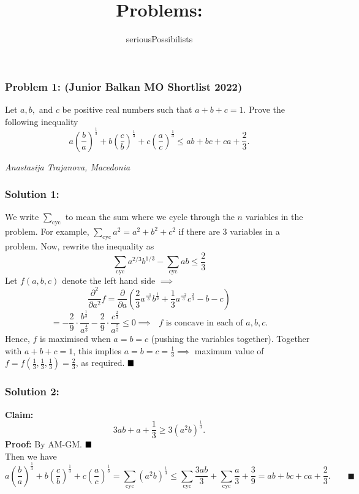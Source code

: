 \documentclass[fontsize=9pt]{scrartcl}
\begin{document}
\title{ Problems: }
\author{seriousPossibilists}
\date{}
\maketitle

\subsubsection*{Problem 1: (Junior Balkan MO Shortlist 2022)} 
Let $a, b,$ and $c$ be positive real numbers such that $a + b + c = 1$. Prove the following inequality
 \[ a \left({\frac{b}{a}} \right)^{\frac13} + b \left({\frac{c}{b}} \right)^{\frac13} + c \left({\frac{a}{c}} \right)^{\frac13} \le ab + bc + ca + \frac{2}{3}. \]
    \begin{flushright}
        { \emph{Anastasija Trajanova, Macedonia} }
    \end{flushright}
\subsubsection*{Solution 1:} We write $\sum_{\text{cyc}}$ to mean the sum where we cycle through the $n$ variables in the problem. \newline
For example, $\sum_{\text{cyc}} a^2 = a^2 + b^2+c^2$ if there are $3$ variables in a problem. \newline
Now, rewrite the inequality as \[\sum_{\text{cyc}} a^{2/3}b^{1/3} - \sum_{\text{cyc}} ab \le \frac 23\]
Let $f(a,b,c)$ denote the left hand side $\implies$ \[\frac{\partial^2}{\partial a^2}f = \frac{\partial}{\partial a} \left( \frac 23 a^{\frac{-1}{3}}b^{\frac 13} + \frac 13 a^{\frac{-2}3} c^{\frac 23} - b-c \right)\] \[=-\frac{2}{9} \cdot \frac{b^{\frac 13}}{a^{\frac 43}} - \frac 29 \cdot \frac{c^{\frac 23}}{a^{\frac 53}} \le 0 \implies \text{ $f$ is concave in each of $a,b,c$.}\]
Hence, $f$ is maximised when $a=b=c$ (pushing the variables together). Together with $a+b+c = 1$, this implies
$a=b=c=\frac13 \implies $ maximum value of $f = f(\frac 13, \frac 13, \frac 13) = \frac 23$, as required. $\hfill \blacksquare$
\subsubsection*{Solution 2:} 
\textbf{Claim:} \[3ab + a + \frac 13 \ge 3(a^2b)^{\frac13}.\]
\textbf{Proof:} By AM-GM. $\hfill \blacksquare$ ~\\
Then we have \[a \left({\frac{b}{a}} \right)^{\frac13} + b \left({\frac{c}{b}} \right)^{\frac13} + c \left({\frac{a}{c}} \right)^{\frac13} = \sum_{\text{cyc}} (a^2b)^{\frac13} \le \sum_{\text{cyc}} \frac{3ab}{3} + \sum_{\text{cyc}} \frac a3 + \frac 39 =ab+bc+ca+\frac23. \quad \quad \blacksquare\] 
\end{document}
